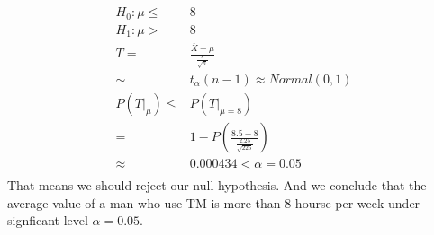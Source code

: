 \documentclass{article}
\begin{document}
    \section{}
        \paragraph{}
        \begin{equation*}
            \begin{split}
                H_0: \mu\leq& 8\\
                H_1: \mu>&8\\
                T=&\frac{\overline{X}-\mu}{\frac{s}{\sqrt{n}}}\\
                    \sim& t_\alpha(n-1)\approx Normal(0,1)\\
                P(T|_\mu)\leq &P(T|_{\mu=8})\\
                    =&1-P(\frac{8.5-8}{\frac{2.25}{\sqrt{225}}})\\
                    \approx&0.000434<\alpha=0.05\\
            \end{split}
        \end{equation*}
        That means we should reject our null hypothesis. And we conclude that the average value of a man who use TM is more than 8 hourse per week under signficant level $\alpha=0.05$.
    \section{}
        \paragraph{}
        
\end{document}
